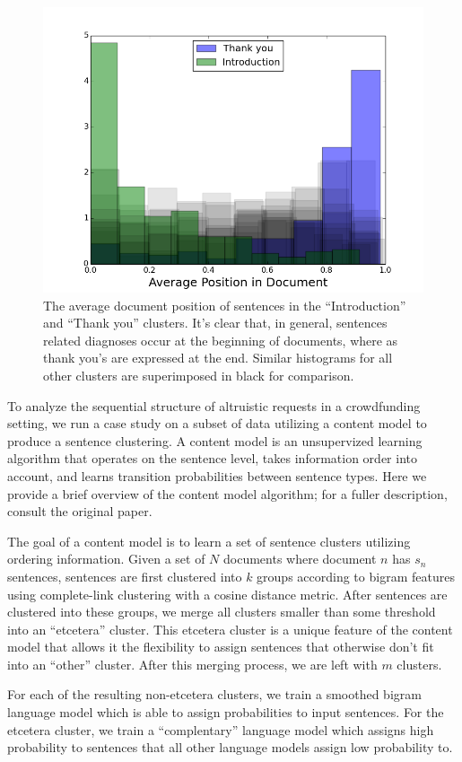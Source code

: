 \documentclass[letterpaper]{article}
\begin{document}
\begin{figure}
\centering
\includegraphics[width=.45\textwidth]{figures/docpos.png}
\caption{The average document position of sentences in the ``Introduction'' and ``Thank you'' clusters. It's clear that, in general, sentences related diagnoses occur at the beginning of documents, where as thank you's are expressed at the end. Similar histograms for all other clusters are superimposed in black for comparison.}
\label{fig:docpos}
\end{figure}

To analyze the sequential structure of altruistic requests in a crowdfunding setting, we run a case study on a subset of data utilizing a content model \cite{barzilay2004catching} to produce a sentence clustering. A content model is an unsupervized learning algorithm that operates on the sentence level, takes information order into account, and learns transition probabilities between sentence types. Here we provide a brief overview of the content model algorithm; for a fuller description, consult the original paper.

The goal of a content model is to learn a set of sentence clusters utilizing ordering information. Given a set of $N$ documents where document $n$ has $s_n$ sentences, sentences are first clustered into $k$ groups according to bigram features using complete-link clustering with a cosine distance metric. After sentences are clustered into these groups, we merge all clusters smaller than some threshold into an ``etcetera'' cluster. This etcetera cluster is a unique feature of the content model that allows it the flexibility to assign sentences that otherwise don't fit into an ``other'' cluster. After this merging process, we are left with $m$ clusters. 

For each of the resulting non-etcetera clusters, we train a smoothed bigram language model which is able to assign probabilities to input sentences. For the etcetera cluster, we train a ``complentary'' language model which assigns high probability to sentences that all other language models assign low probability to.
\end{document}
